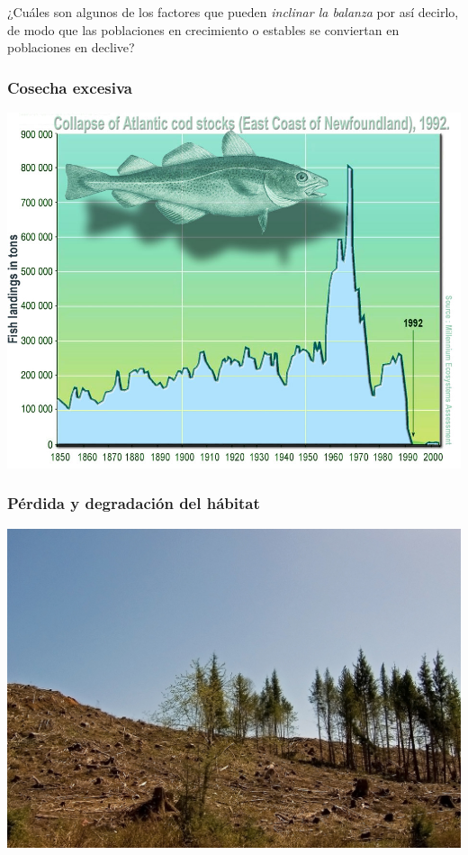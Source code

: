 \documentclass[
]{article}
\begin{document}
¿Cuáles son algunos de los factores que pueden \emph{inclinar la
balanza} por así decirlo, de modo que las poblaciones en crecimiento o
estables se conviertan en poblaciones en declive?

\hypertarget{cosecha-excesiva}{%
\subsubsection{Cosecha excesiva}\label{cosecha-excesiva}}

\includegraphics{figures/overharvest1.jpg}

\hypertarget{puxe9rdida-y-degradaciuxf3n-del-huxe1bitat}{%
\subsubsection{Pérdida y degradación del
hábitat}\label{puxe9rdida-y-degradaciuxf3n-del-huxe1bitat}}

\includegraphics{figures/habitatloss1.jpg}
\end{document}
